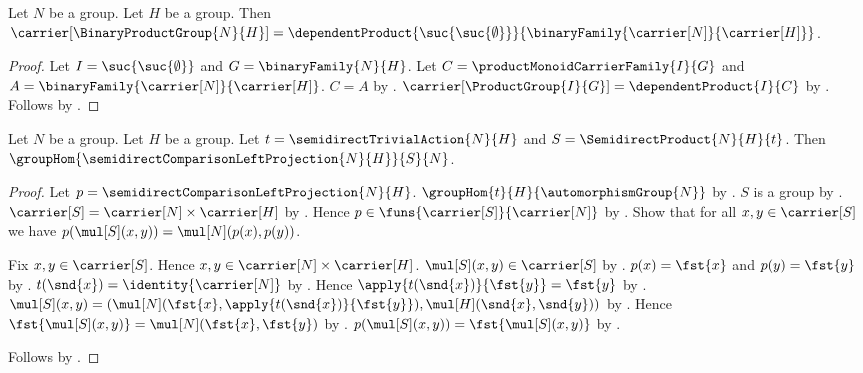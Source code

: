 \begin{proposition}\label{semidirect_binary_product_carrier}
    Let $N$ be a group.
    Let $H$ be a group.
    Then
        $\carrier[\BinaryProductGroup{N}{H}]=
            \dependentProduct
                {\suc{\suc{\emptyset}}}
                {\binaryFamily{\carrier[N]}{\carrier[H]}}$.
\end{proposition}
\begin{proof}
    Let $I=\suc{\suc{\emptyset}}$ and $G=\binaryFamily{N}{H}$.
    Let $C=\productMonoidCarrierFamily{I}{G}$ and
        $A=\binaryFamily{\carrier[N]}{\carrier[H]}$.
    $C=A$ by .
    $\carrier[\ProductGroup{I}{G}]=\dependentProduct{I}{C}$ by
        .
    Follows by .
\end{proof}

\begin{theorem}\label{semidirect_comparison_left_projection_hom}
    Let $N$ be a group.
    Let $H$ be a group.
    Let $t=\semidirectTrivialAction{N}{H}$ and
        $S=\SemidirectProduct{N}{H}{t}$.
    Then $\groupHom{\semidirectComparisonLeftProjection{N}{H}}{S}{N}$.
\end{theorem}
\begin{proof}
    Let $p=\semidirectComparisonLeftProjection{N}{H}$.
    $\groupHom{t}{H}{\automorphismGroup{N}}$ by
        .
    $S$ is a group by .
    $\carrier[S]=\carrier[N]\times\carrier[H]$ by
        .
    Hence $p\in\funs{\carrier[S]}{\carrier[N]}$ by
        .
    Show that for all $x,y\in\carrier[S]$ we have
        $p(\mul[S](x,y))=\mul[N](p(x),p(y))$.
    \begin{subproof}
        Fix $x,y\in\carrier[S]$.
        Hence $x,y\in\carrier[N]\times\carrier[H]$.
        $\mul[S](x,y)\in\carrier[S]$ by
            .
        $p(x)=\fst{x}$ and $p(y)=\fst{y}$ by
            .
        $t(\snd{x})=\identity{\carrier[N]}$ by
            .
        Hence $\apply{t(\snd{x})}{\fst{y}}=\fst{y}$ by
            .
        $\mul[S](x,y)=
            (\mul[N](\fst{x},\apply{t(\snd{x})}{\fst{y}}),
             \mul[H](\snd{x},\snd{y}))$ by
            .
        Hence $\fst{\mul[S](x,y)}=\mul[N](\fst{x},\fst{y})$ by
            .
        $p(\mul[S](x,y))=\fst{\mul[S](x,y)}$ by
            .
    \end{subproof}
    Follows by .
\end{proof}

